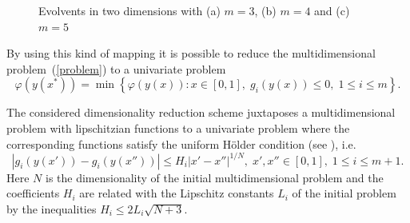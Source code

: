 \documentclass[a4paper]{jpconf}
\begin{document}
\begin{figure}[t]
\begin{minipage}{0.32\linewidth}
\end{minipage}
\begin{minipage}{0.32\linewidth}
\end{minipage}
\caption{Evolvents in two dimensions with (a) $m=3$, (b) $m=4$ and (c) $m=5$}
\label{fig:0}
\end{figure}



By using this kind of mapping it is possible to reduce the multidimensional 
problem~(\ref{problem}) to a univariate problem
\[
\varphi(y(x^\ast))=\min \left\{\varphi(y(x)): x \in [0,1], \; g_i(y(x))\leq 
0, \; 1 \leq i \leq m\right\}.
\]

The considered dimensionality reduction scheme juxtaposes a
multidimensional problem with lipschitzian functions to a univariate
problem where the corresponding functions satisfy the uniform H{\"o}lder
condition (see \cite{Strongin2000}), i.e.
\begin{equation}\label{holder}
\left|g_i(y(x'))-g_i (y(x''))\right| \leq H_i \left|x'-x'' \right|^{1/N}, \; 
x',x''\in [0,1], \; 1\leq i \leq m+1.
\end{equation}
Here $N$ is the dimensionality of the initial multidimensional problem and
the coefficients $H_i$ are related with the Lipschitz constants $L_i$ of
the initial problem by the inequalities $H_i \leq 2L_i \sqrt{N+3}$.
\end{document}
